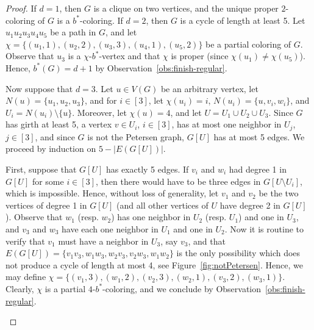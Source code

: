 \documentclass[runningheads, envcountsame]{llncs}
\begin{document}
\begin{proof}
If $d = 1$, then $G$ is a clique on two vertices, and the unique proper $2$-coloring of $G$ is a $b^*$-coloring.
If $d = 2$, then $G$ is a cycle of length at least 5.
Let $u_1u_2u_3u_4u_5$ be a path in $G$, and let $\chi = \{(u_1, 1), (u_2, 2), (u_3, 3), (u_4, 1), (u_5, 2)\}$ be a partial coloring of $G$.
Observe that $u_3$ is a $\chi$-$b^*$-vertex and that $\chi$ is proper (since $\chi(u_1) \ne \chi(u_5)$).
Hence, $b^*(G) = d+1$ by Observation~\ref{obs:finish-regular}.

Now suppose that $d = 3$.
Let $u \in V(G)$ be an arbitrary vertex, let $N(u) = \{u_1, u_2, u_3\}$, and for $i \in [3]$, let $\chi(u_i) = i$, $N(u_i) = \{u, v_i, w_i\}$, and $U_i = N(u_i) \setminus \{u\}$.
Moreover, let $\chi(u) = 4$, and let $U = U_1 \cup U_2 \cup U_3$.
Since $G$ has girth at least 5, a vertex $v \in U_i$, $i \in [3]$, has at most one neighbor in $U_j$, $j \in [3]$, and since $G$ is not the Petersen graph, $G[U]$ has at most 5 edges.
We proceed by induction on $5 - |E(G[U])|$.

First, suppose that $G[U]$ has exactly 5 edges.
If $v_i$ and $w_i$ had degree 1 in $G[U]$ for some $i \in [3]$, then there would have to be three edges in $G[U \setminus U_i]$, which is impossible.
Hence, without loss of generality, let $v_1$ and $v_2$ be the two vertices of degree 1 in $G[U]$ (and all other vertices of $U$ have degree 2 in $G[U]$).
Observe that $w_1$ (resp. $w_2$) has one neighbor in $U_2$ (resp. $U_1$) and one in $U_3$, and $v_3$ and $w_3$ have each one neighbor in $U_1$ and one in $U_2$.
Now it is routine to verify that $v_1$ must have a neighbor in $U_3$, say $v_3$, and that $E(G[U]) = \{v_1v_3, w_1w_3, w_2v_3, v_2w_3, w_1w_2\}$ is the only possibility which does not produce a cycle of length at most 4, see Figure~\ref{fig:notPetersen}.
Hence, we may define $\chi = \{(v_1, 3), (w_1, 2), (v_2, 3), (w_2, 1), (v_3, 2), (w_3, 1)\}$.
Clearly, $\chi$ is a partial $4$-$b^*$-coloring, and we conclude by Observation~\ref{obs:finish-regular}.

\begin{figure}[t]
\centering
{}
\end{figure}
\end{proof}
\end{document}
